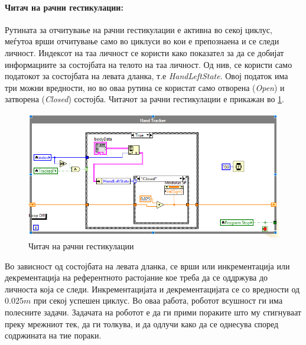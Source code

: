 \documentclass[11pt]{article}
\begin{document}
    \paragraph{Читач на рачни гестикулации:\\}
      Рутината за отчитување на рачни гестикулации е активна во секој циклус, меѓутоа врши отчитување само во циклуси во кои е препознаена и се следи личност. Индексот на таа личност се користи како показател за да се добијат информациите за состојбата на телото на таа личност. Од нив, се користи само податокот за состојбата на левата дланка, т.е \textit{HandLeftState}. Овој податок има три можни вредности, но во оваа рутина се користат само отворена (\textit{Open}) и затворена (\textit{Closed}) состојба. Читачот за рачни гестикулации е прикажан во \ref{fig:hand_control}.

      \begin{figure}[H]
        \centering
        \includegraphics[width=0.85\linewidth]{./images/hand_control.png}
        \caption{Читач на рачни гестикулации}
        \label{fig:hand_control}
        \end{figure}

      Во зависност од состојбата на левата дланка, се врши или инкрементација или декрементација на референтното растојание кое треба да се оддржува до личноста која се следи. Инкрементацијата и декрементацијата се со вредности од $0.025m$ при секој успешен циклус.
    \bigbreak
    Во оваа работа, роботот всушност ги има полесните задачи. Задачата на роботот е да ги прими пораките што му стигнуваат преку мрежниот тек, да ги толкува, и да одлучи како да се однесува според содржината на тие пораки.
\end{document}
